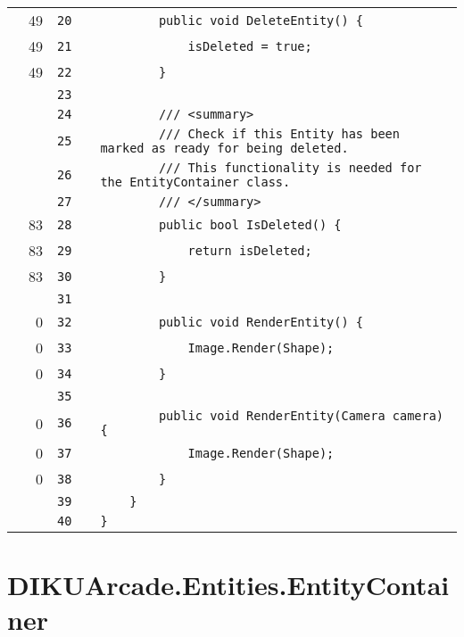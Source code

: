 \documentclass[a4paper,landscape,10pt]{article}
\begin{document}
\begin{longtable}[l]{lrrll}
\cellcolor{green} & 49 & \verb~20~ & & \verb~        public void DeleteEntity() {~\\
\cellcolor{green} & 49 & \verb~21~ & & \verb~            isDeleted = true;~\\
\cellcolor{green} & 49 & \verb~22~ & & \verb~        }~\\
\cellcolor{gray} &  & \verb~23~ & & \verb~~\\
\cellcolor{gray} &  & \verb~24~ & & \verb~        /// <summary>~\\
\cellcolor{gray} &  & \verb~25~ & & \verb~        /// Check if this Entity has been marked as ready for being deleted.~\\
\cellcolor{gray} &  & \verb~26~ & & \verb~        /// This functionality is needed for the EntityContainer class.~\\
\cellcolor{gray} &  & \verb~27~ & & \verb~        /// </summary>~\\
\cellcolor{green} & 83 & \verb~28~ & & \verb~        public bool IsDeleted() {~\\
\cellcolor{green} & 83 & \verb~29~ & & \verb~            return isDeleted;~\\
\cellcolor{green} & 83 & \verb~30~ & & \verb~        }~\\
\cellcolor{gray} &  & \verb~31~ & & \verb~~\\
\cellcolor{red} & 0 & \verb~32~ & & \verb~        public void RenderEntity() {~\\
\cellcolor{red} & 0 & \verb~33~ & & \verb~            Image.Render(Shape);~\\
\cellcolor{red} & 0 & \verb~34~ & & \verb~        }~\\
\cellcolor{gray} &  & \verb~35~ & & \verb~~\\
\cellcolor{red} & 0 & \verb~36~ & & \verb~        public void RenderEntity(Camera camera) {~\\
\cellcolor{red} & 0 & \verb~37~ & & \verb~            Image.Render(Shape);~\\
\cellcolor{red} & 0 & \verb~38~ & & \verb~        }~\\
\cellcolor{gray} &  & \verb~39~ & & \verb~    }~\\
\cellcolor{gray} &  & \verb~40~ & & \verb~}~\\
\end{longtable}
\newpage
\section{DIKUArcade.Entities.EntityContainer}
\end{document}
